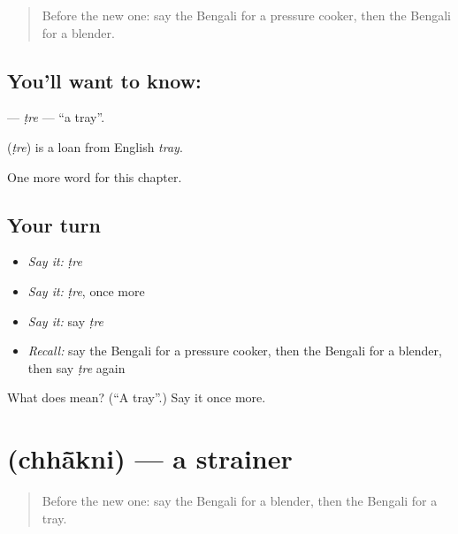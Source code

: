 \label{lesson:BN-C206-tre}



\begin{quote}
Before the new one: say the Bengali for a pressure cooker, then the Bengali for a blender.
\end{quote}

\subsection*{You'll want to know: }
\textbf{} — \emph{ṭre} — \textquotedblleft{}a tray\textquotedblright{}.

\begin{cousinweb}
\textbf{} (\emph{ṭre}) is a loan from English \emph{tray}.
\end{cousinweb}

\begin{grammarlens}[title={What you've built}]
One more word for this chapter.
\end{grammarlens}

\subsection*{Your turn}
\begin{itemize}
\raggedright
  \item \emph{Say it:} \emph{ṭre}
  \item \emph{Say it:} \emph{ṭre}, once more
  \item \emph{Say it:} say \emph{ṭre}
  \item \emph{Recall:} say the Bengali for a pressure cooker, then the Bengali for a blender, then say \emph{ṭre} again
\end{itemize}

\begin{tcolorbox}[breakable,colback=teal!4,colframe=teal!35!black,title={Before you move on}]
What does  mean? (\textquotedblleft{}A tray\textquotedblright{}.) Say it once more.
\end{tcolorbox}
\section[\texorpdfstring{\bn{ছাঁকনি} (chhā̃kni)}{ছাঁকনি (chhā̃kni)}]{ (chhā̃kni) — a strainer}

\label{lesson:BN-C206-chhakni}



\begin{quote}
Before the new one: say the Bengali for a blender, then the Bengali for a tray.
\end{quote}

